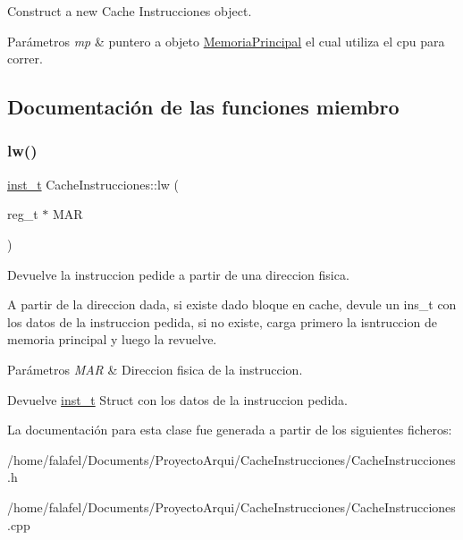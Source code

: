 Construct a new Cache Instrucciones object. 


\begin{DoxyParams}{Parámetros}
{\em mp} & puntero a objeto \hyperlink{classMemoriaPrincipal}{Memoria\+Principal} el cual utiliza el cpu para correr. \\
\hline
\end{DoxyParams}


\subsection{Documentación de las funciones miembro}
\mbox{\label{classCacheInstrucciones_abb2ffa3f97abb0a72dc686e81f1498fd}} 
\subsubsection{\texorpdfstring{lw()}{lw()}}
{\footnotesize\ttfamily \hyperlink{structinst__t}{inst\+\_\+t} Cache\+Instrucciones\+::lw (\begin{DoxyParamCaption}\item[{reg\+\_\+t $\ast$}]{M\+AR }\end{DoxyParamCaption})}



Devuelve la instruccion pedide a partir de una direccion fisica. 

A partir de la direccion dada, si existe dado bloque en cache, devule un ins\+\_\+t con los datos de la instruccion pedida, si no existe, carga primero la isntruccion de memoria principal y luego la revuelve. 
\begin{DoxyParams}{Parámetros}
{\em M\+AR} & Direccion fisica de la instruccion. \\
\hline
\end{DoxyParams}
\begin{DoxyReturn}{Devuelve}
\hyperlink{structinst__t}{inst\+\_\+t} Struct con los datos de la instruccion pedida. 
\end{DoxyReturn}


La documentación para esta clase fue generada a partir de los siguientes ficheros\+:\begin{DoxyCompactItemize}
\item 
/home/falafel/\+Documents/\+Proyecto\+Arqui/\+Cache\+Instrucciones/Cache\+Instrucciones.\+h\item 
/home/falafel/\+Documents/\+Proyecto\+Arqui/\+Cache\+Instrucciones/Cache\+Instrucciones.\+cpp\end{DoxyCompactItemize}
